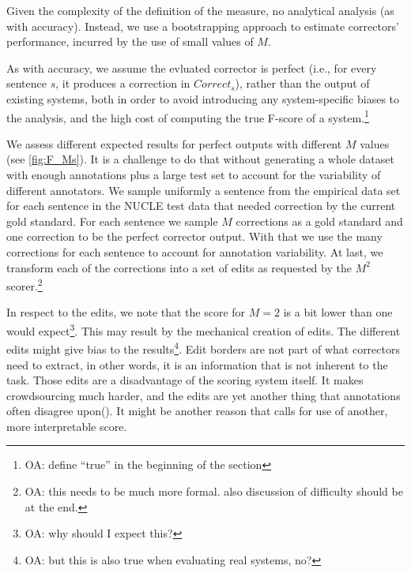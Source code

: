 \documentclass[letter,11pt]{article}
\newcommand{\oa}[1]{\footnote{\color{red}OA: #1}}
\begin{document}
 Given the complexity of the definition of the measure, no analytical
 analysis (as with accuracy). Instead, we use a bootstrapping
 approach to estimate correctors' performance,
 incurred by the use of small values of $M$.
 


 As with accuracy, we assume the evluated corrector is perfect 
 (i.e., for every sentence $s$, it produces a correction in $Correct_s$),
 rather than the output of existing systems, both
 in order to avoid introducing any system-specific biases to the analysis,
 and the high cost of computing the true F-score of a system.\oa{define ``true''
   in the beginning of the section}

 We assess different expected results for perfect outputs with different
 $M$ values (see \ref{fig:F_Ms}).
 It is a challenge to do that without generating a whole dataset with enough annotations plus a large test
 set to account for the variability of different annotators. We sample uniformly a sentence from the
 empirical data set for each sentence in the NUCLE test data that needed correction by the current gold standard.
 For each sentence we sample $M$ corrections as a gold standard and one correction to be the perfect corrector
 output. With that we use the many corrections for each sentence to account for annotation variability.
 At last, we transform each of the corrections into a set of edits as requested
 by the $M^2$ scorer.\oa{this needs to be much more formal. also discussion
 of difficulty should be at the end.}

 
In respect to the edits, we note that the score for $M=2$ is a bit lower than one would expect\oa{why should I expect this?}. This may result by the mechanical creation of edits. The different edits might give bias to the results\oa{but this is also true when evaluating real systems, no?}. Edit borders are not part of what correctors need to extract, in other words, it is an information that is not inherent to the task. Those edits are a disadvantage of the scoring system itself. It makes crowdsourcing much harder, and the edits are yet another thing that annotations often disagree upon(\cite{dahlmeier2012better}). It might be another reason that calls for use of another, more interpretable score.
\end{document}
